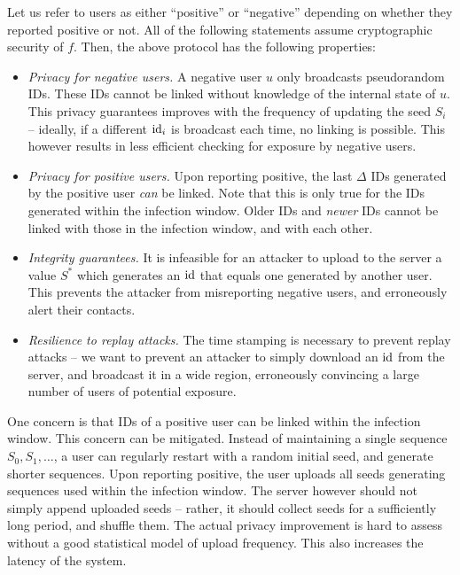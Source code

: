 \documentclass{article}
\begin{document}
 Let us refer to users as either ``positive'' or ``negative'' depending on whether they reported positive or not. All of the following statements assume cryptographic security of $f$. Then, the above protocol has the following properties:
\begin{itemize}
    \item {\em Privacy for negative users.}  A negative user $u$ only broadcasts pseudorandom IDs. These IDs cannot be linked without knowledge of the internal state of $u$. This privacy guarantees improves with the frequency of updating the seed $S_i$ -- ideally, if a different $\mathrm{id}_i$ is broadcast each time, no linking is possible. This however results in less efficient checking for exposure by negative users.
    \item {\em Privacy for positive users.} Upon reporting positive, the last $\Delta$ IDs generated by the positive user {\em can} be linked. Note that this is only true for the IDs generated within the infection window. Older IDs and {\em newer} IDs cannot be linked with those in the infection window, and with each other.
    \item {\em Integrity guarantees.} It is infeasible for an attacker to upload to the server a value $S^*$ which generates an $\mathrm{id}$ that equals one generated by another user. This prevents the attacker from misreporting negative users, and erroneously alert their contacts.  
    \item {\em Resilience to replay attacks.} The time stamping is necessary to prevent replay attacks -- we want to prevent an attacker to simply download an $\mathrm{id}$ from the server, and broadcast it in a wide region, erroneously convincing a large number of users of potential exposure.
\end{itemize}

 One concern is that IDs of a positive user can be linked within the infection window. This concern can be mitigated. Instead of maintaining a single sequence $S_0, S_1, \ldots$, a user can regularly restart with a random initial seed, and generate  shorter sequences. Upon reporting positive, the user uploads all seeds generating sequences used within the infection window. The server however should not simply append uploaded seeds -- rather, it should collect seeds for a sufficiently long period, and shuffle them. The actual privacy improvement is  hard to assess without a good statistical model of upload frequency. This also increases the latency of the system.
\end{document}

